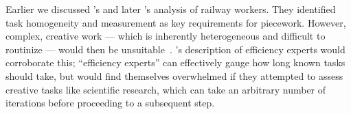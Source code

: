 \documentclass[trackingWork]{subfiles}
\begin{document}
Earlier we discussed \citeauthor{10.2307/23702539}'s and later \citeauthor{Brown01041990}'s analysis of railway workers.
They identified task homogeneity and measurement as key requirements for piecework.
However, complex, creative work
--- which is inherently heterogeneous and difficult to routinize ---
would then be unsuitable~\cite{10.2307/23702539}.
\citeauthor{Brown01041990}'s description of efficiency experts would corroborate this;
``efficiency experts'' can effectively gauge how long known tasks should take, but
would find themselves overwhelmed if they attempted to assess creative tasks like scientific research,
which can take an arbitrary number of iterations before proceeding to a subsequent step.






\end{document}
